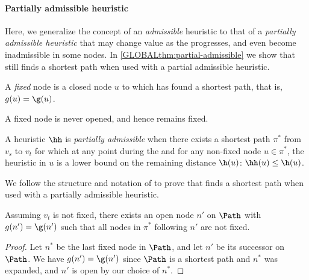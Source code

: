 \paragraph{Partially admissible heuristic} \label{GLOBALsec:partial-admissible}

Here, we generalize the concept of an \emph{admissible} heuristic to that of a
\emph{partially admissible heuristic} that may change value as the \A
progresses, and even become inadmissible in some nodes.
In \cref{GLOBALthm:partial-admissible} we show that \A still finds a shortest path
when used with a partial admissible heuristic.

\begin{definition}
  A \emph{fixed} node is a closed node $u$ to which \A has found a shortest path,
  that is, $g(u) = \g(u)$.
\end{definition}
A fixed node is never opened, and hence remains fixed.

\begin{definition}
  A heuristic $\hh$ is \emph{partially admissible} when there exists a shortest
  path $\pi^*$ from  $v_s$ to $v_t$ for which at any point during the \A and for
  any non-fixed node $u\in \pi^*$, the heuristic in $u$ is a lower bound on
  the remaining distance $\h(u)$: $\hh(u) \leq \h(u)$.
\end{definition}

We follow the structure and notation of \citet{hart1968formal} to prove that \A
finds a shortest path when used with a partially admissible heuristic.
\begin{lem}\label{GLOBALlemma1}
  Assuming $v_t$ is not fixed,
  there exists an open node $n'$ on $\Path$ with $g(n') = \g(n')$ such that
  all nodes in $\pi^*$ following $n'$ are not fixed.
\end{lem}
\begin{proof}
  Let $n^*$ be the last fixed node in $\Path$, and let
  $n'$ be its successor on $\Path$. We have $g(n') = \g(n')$ since $\Path$ is a
  shortest path and $n^*$ was expanded, and $n'$ is open by our choice of $n^*$.
\end{proof}


